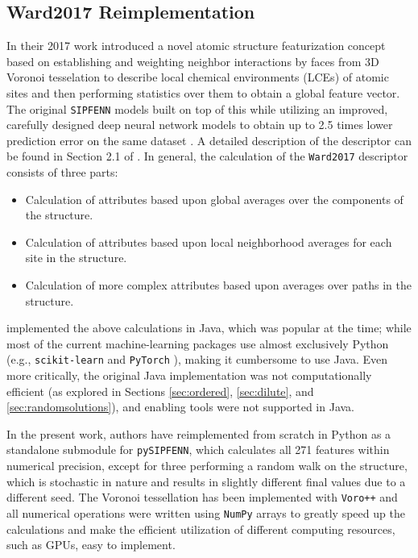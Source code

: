 \subsection{Ward2017 Reimplementation} \label{ssec:Ward2017Translation}

In their 2017 work \citet{Ward2017} introduced a novel atomic structure featurization concept based on establishing and weighting neighbor interactions by faces from 3D Voronoi tesselation to describe local chemical environments (LCEs) of atomic sites and then performing statistics over them to obtain a global feature vector. The original \texttt{SIPFENN} models \cite{Krajewski2020SIPFENNModels} built on top of this while utilizing an improved, carefully designed deep neural network models to obtain up to 2.5 times lower prediction error on the same dataset \cite{Krajewski2022ExtensibleNetworks}. A detailed description of the descriptor can be found in Section 2.1 of \citet{Krajewski2022ExtensibleNetworks}. In general, the calculation of the \texttt{Ward2017} descriptor consists of three parts:

\begin{itemize}
    \item Calculation of attributes based upon global averages over the components of the structure.
    \item Calculation of attributes based upon local neighborhood averages for each site in the structure.
    \item Calculation of more complex attributes based upon averages over paths in the structure.
\end{itemize}

\citet{Ward2017} implemented the above calculations in Java, which was popular at the time; while most of the current machine-learning packages use almost exclusively Python (e.g., \texttt{scikit-learn} \cite{PedregosaFABIANPEDREGOSA2011Scikit-learn:Python} and \texttt{PyTorch} \cite{Paszke2019PyTorch:Library}), making it cumbersome to use Java. Even more critically, the original Java implementation was not computationally efficient (as explored in Sections \ref{sec:ordered}, \ref{sec:dilute}, and \ref{sec:randomsolutions}), and enabling tools were not supported in Java.

In the present work, authors have reimplemented \citet{Ward2017} from scratch in Python as a standalone submodule for \texttt{pySIPFENN}, which calculates all 271 features within numerical precision, except for three performing a random walk on the structure, which is stochastic in nature and results in slightly different final values due to a different seed. The Voronoi tessellation has been implemented with \texttt{Voro++} \cite{Rycroft2007MultiscaleFlow, Rycroft2009Voro++:C++, Lu2023AnCells} and all numerical operations were written using \texttt{NumPy} \cite{Harris2020ArrayNumPy} arrays to greatly speed up the calculations and make the efficient utilization of different computing resources, such as GPUs, easy to implement.

